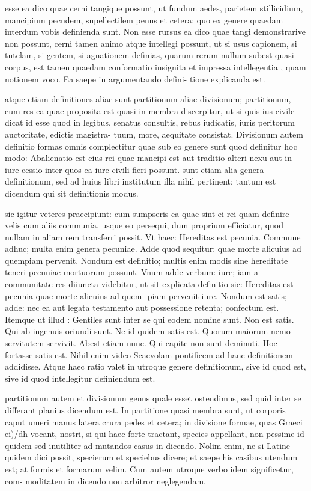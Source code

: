  esse ea dico quae cerni tangique possunt, ut fundum aedes, parietem stillicidium, mancipium pecudem, supellectilem penus et cetera; quo ex genere quaedam interdum vobis definienda sunt. Non esse rursus ea dico quae tangi demonstrarive non possunt, cerni tamen animo atque intellegi possunt, ut si usus capionem, si tutelam, si gentem, si agnationem definias, quarum rerum nullum subest quasi corpus, est tamen quaedam conformatio insignita et impressa intellegentia , quam notionem voco. Ea saepe in argumentando defini- tione explicanda est.

 atque etiam definitiones aliae sunt partitionum aliae divisionum; partitionum, cum res ea quae proposita est quasi in membra discerpitur, ut si quis ius civile dicat id esse quod in legibus, senatus consultis, rebus iudicatis, iuris peritorum auctoritate, edictis magistra- tuum, more, aequitate consistat. Divisionum autem definitio formas omnis complectitur quae sub eo genere sunt quod definitur hoc modo: Abalienatio est eius rei quae mancipi est aut traditio alteri nexu aut in iure cessio inter quos ea iure civili fieri possunt. sunt etiam alia genera definitionum, sed ad huius libri institutum illa nihil pertinent; tantum est dicendum qui sit definitionis modus.

 sic igitur veteres praecipiunt: cum sumpseris ea quae sint ei rei quam definire velis cum aliis communia, usque eo persequi, dum proprium efficiatur, quod nullam in aliam rem transferri possit. Vt haec: Hereditas est pecunia. Commune adhuc; multa enim genera pecuniae. Adde quod sequitur: quae morte alicuius ad quempiam pervenit. Nondum est definitio; multis enim modis sine hereditate teneri pecuniae mortuorum possunt. Vnum adde verbum: iure; iam a communitate res diiuncta videbitur, ut sit explicata definitio sic: Hereditas est pecunia quae morte alicuius ad quem- piam pervenit iure. Nondum est satis; adde: nec ea aut legata testamento aut possessione retenta; confectum est. Itemque ut illud : Gentiles sunt inter se qui eodem nomine sunt. Non est satis. Qui ab ingenuis oriundi sunt. Ne id quidem satis est. Quorum maiorum nemo servitutem servivit. Abest etiam nunc. Qui capite non sunt deminuti. Hoc fortasse satis est. Nihil enim video Scaevolam pontificem ad hanc definitionem addidisse. Atque haec ratio valet in utroque genere definitionum, sive id quod est, sive id quod intellegitur definiendum est.

 partitionum autem et divisionum genus quale esset ostendimus, sed quid inter se differant planius dicendum est. In partitione quasi membra sunt, ut corporis caput umeri manus latera crura pedes et cetera; in divisione formae, quas Graeci ei)/dh vocant, nostri, si qui haec forte tractant, species appellant, non pessime id quidem sed inutiliter ad mutandos casus in dicendo. Nolim enim, ne si Latine quidem dici possit, specierum et speciebus dicere; et saepe his casibus utendum est; at formis et formarum velim. Cum autem utroque verbo idem significetur, com- moditatem in dicendo non arbitror neglegendam.

